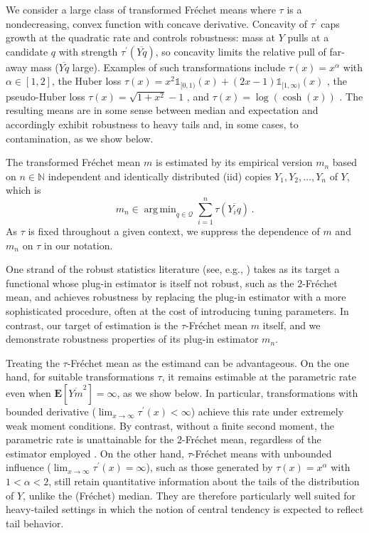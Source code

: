 \documentclass{article}
\newcommand*{\mc}[1]{\mathcal{#1}}
\newcommand{\N}{\mathbb{N}}
\newcommand{\E}{\mathbf{E}} %
\newcommand{\Eof}[1]{\E[#1]}
\newcommand{\pr}{^\prime}
\newcommand{\ind}{\mathds{1}}%
\newcommand{\eqfs}{\,.}
\DeclareMathOperator*{\argmin}{arg\,min}
\newcommand{\ol}[2]{\overline{#1#2}}
\newcommand{\tran}{\tau}
\newcommand{\dtran}{\tau\pr}
\begin{document}
We consider a large class of transformed Fr\'echet means where $\tran$ is a nondecreasing, convex function with concave derivative. Concavity of $\dtran$ caps growth at the quadratic rate and controls robustness: mass at $Y$ pulls at a candidate $q$ with strength $\dtran(\ol Yq)$, so concavity limits the relative pull of far-away mass ($\ol Yq$ large). Examples of such transformations include $\tran(x) = x^\alpha$ with $\alpha \in [1,2]$, the Huber loss $\tran(x) = x^2 \ind_{[0,1)}(x) + (2x-1) \ind_{[1,\infty)}(x)$ \cite{huber64}, the pseudo-Huber loss $\tran(x) = \sqrt{1+x^2}-1$ \cite{charbonnier94}, and $\tran(x) = \log(\cosh(x))$ \cite{green90}. The resulting means are in some sense between median and expectation and accordingly exhibit robustness to heavy tails and, in some cases, to contamination, as we show below. 

The transformed Fr\'echet mean $m$ is estimated by its empirical version $m_n$ based on $n\in\N$ independent and identically distributed (iid) copies $Y_1, Y_2, \dots, Y_n$ of $Y$, which is
\begin{equation}
    m_n \in \argmin_{q\in\mc Q} \sum_{i=1}^n \tran(\ol{Y_i}q)
    \eqfs
\end{equation}
As $\tran$ is fixed throughout a given context, we suppress the dependence of $m$ and $m_n$ on $\tran$ in our notation.

One strand of the robust statistics literature (see, e.g., \cite{Lugosi2019, Hubert2008}) takes as its target a functional whose plug-in estimator is itself not robust, such as the $2$-Fr\'echet mean, and achieves robustness by replacing the plug-in estimator with a more sophisticated procedure, often at the cost of introducing tuning parameters. In contrast, our target of estimation is the $\tran$-Fr\'echet mean $m$ itself, and we demonstrate robustness properties of its plug-in estimator $m_n$.

Treating the $\tran$-Fr\'echet mean as the estimand can be advantageous. On the one hand, for suitable transformations $\tran$, it remains estimable at the parametric rate even when $\Eof{\ol Ym^2}=\infty$, as we show below. In particular, transformations with bounded derivative ($\lim_{x\to\infty}\dtran(x)<\infty$) achieve this rate under extremely weak moment conditions. By contrast, without a finite second moment, the parametric rate is unattainable for the $2$-Fr\'echet mean, regardless of the estimator employed \cite[Theorem~3.1]{Devroye2016}. On the other hand, $\tran$-Fr\'echet means with unbounded influence ($\lim_{x\to\infty}\dtran(x)=\infty$), such as those generated by $\tran(x)=x^\alpha$ with $1<\alpha<2$, still retain quantitative information about the tails of the distribution of $Y$, unlike the (Fr\'echet) median. They are therefore particularly well suited for heavy-tailed settings in which the notion of central tendency is expected to reflect tail behavior.
\end{document}
